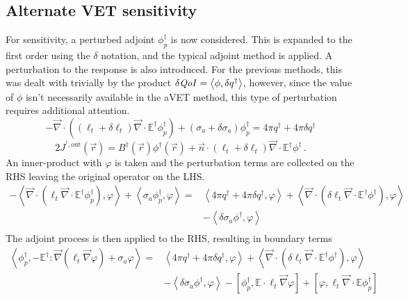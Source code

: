 \documentclass[12pt]{report}
\newcommand{\vr}{\vec{r}}
\newcommand{\bra}{\left\langle}
\newcommand{\ket}{\right\rangle}
\newcommand{\sbra}{\left[}
\newcommand{\sket}{\right]}
\renewcommand{\div}{\vec{\nabla} \cdot}
\newcommand{\grad}{\vec{\nabla}}
\newcommand{\vn}{\vec{n}}
\newcommand{\Edd}{\mathbb{E}}
\newcommand{\BEdd}{B}
\newcommand{\siga}{\sigma_a}
\newcommand{\isigt}{\ell_t}
\newcommand{\scalResp}{q^\dag}
\newcommand{\qoi}{{\it QoI}\xspace}
\begin{document}
\subsection{Alternate VET sensitivity}
For sensitivity, a perturbed adjoint $\phi^\dag_p$ is now considered. This is expanded to the first order using the $\delta$ notation, and the typical adjoint method is applied. A perturbation to the response is also introduced. For the previous methods, this was dealt with trivially by the product $\delta \qoi = \bra \phi , \delta q^\dag \ket$, however, since the value of $\phi$ isn't necessarily available in the aVET method, this type of perturbation requires additional attention.
\begin{equation}
- \div \left( (\isigt + \delta \isigt )\div \Edd^\dag \phi^\dag_p  \right)  +  (\siga + \delta \siga) \phi^\dag_p  =  4 \pi \scalResp + 4 \pi\delta \scalResp
\end{equation}
\begin{equation}
2 J^{^\dag,\text{out}}(\vr) = \BEdd^\dag(\vr) \phi^\dag(\vr)  + \vn \cdot (\isigt + \delta \isigt) \div \Edd^\dag  \phi^\dag  \,.
\end{equation}
An inner-product with $\varphi$ is taken and the perturbation terms are collected on the RHS leaving the original operator on the LHS.
\begin{equation}
\begin{split}
- \bra\div \left( \isigt \div \Edd^\dag \phi^\dag_p  \right), \varphi \ket + \bra \siga  \phi^\dag_p , \varphi \ket  =& \bra 4 \pi \scalResp + 4 \pi\delta \scalResp , \varphi \ket + \bra\div \left( \delta \isigt \div \Edd^\dag \phi^\dag  \right), \varphi \ket \\ 
&- \bra \delta \siga \phi^\dag , \varphi \ket \\
\end{split}
\end{equation}
The adjoint process is then applied to the RHS, resulting in boundary terms
\begin{equation}
\label{AltVetPertDeriv}
\begin{split}
 \bra  \phi^\dag_p , -\Edd^\dag : \grad \left( \isigt \grad \varphi \right) + \siga  \varphi \ket  =& \bra 4 \pi \scalResp + 4 \pi\delta \scalResp , \varphi \ket + \bra\div \left( \delta \isigt \div \Edd^\dag \phi^\dag  \right), \varphi \ket \\ 
&- \bra \delta \siga \phi^\dag , \varphi \ket - \sbra \phi^\dag_p, \Edd \cdot \isigt \grad \varphi \sket + \sbra \varphi, \isigt \div \Edd \phi^\dag_p \sket  \\
\end{split}
\end{equation}
\end{document}
